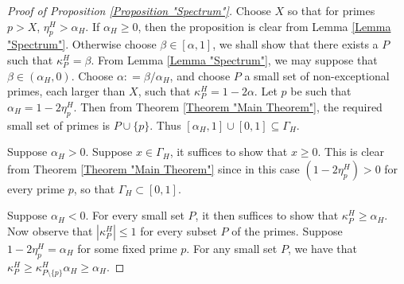 \documentclass[12pt, a4paper]{amsart}
\theoremstyle{remark}
\theoremstyle{proof}
\numberwithin{equation}{section}
\numberwithin{assumption}{section}
\begin{document}
	\begin{proof}[Proof of Proposition \ref{Proposition "Spectrum"}] Choose $X$ so that for primes $p > X$, $\eta_p^H > \alpha_H$. If $\alpha_H \geqslant 0$, then the proposition is clear from Lemma \ref{Lemma "Spectrum"}. Otherwise choose $\beta\in [\alpha,1]$, we shall show that there exists a $P$ such that $\kappa_P^H = \beta$. From Lemma \ref{Lemma "Spectrum"}, we may suppose that $\beta\in (\alpha_H,0)$. Choose $\alpha : = \beta/\alpha_H$, and choose $P$ a small set of non-exceptional primes, each larger than $X$, such that $\kappa_P^H = 1-2\alpha$. Let $p$ be such that $\alpha_H = 1-2\eta_p^H$. Then from Theorem \ref{Theorem "Main Theorem"}, the required small set of primes is $P\cup \{p\}$. Thus $[\alpha_H,1]\cup [0,1] \subseteq \Gamma_H$. 
		
	Suppose $\alpha_H > 0$. Suppose $x\in \Gamma_H$, it suffices to show that $x \geqslant 0$. This is clear from Theorem \ref{Theorem "Main Theorem"} since in this case $(1-2\eta_p^H) > 0$ for every prime $p$, so that $\Gamma_H \subset [0,1]$.
	
	Suppose $\alpha_H < 0$. For every small set $P$, it then suffices to show that $\kappa_P^H \geqslant \alpha_H$. Now observe that $|\kappa_P^H| \leqslant 1$ for every subset $P$ of the primes. Suppose $1-2\eta_p^H = \alpha_H$ for some fixed prime $p$. For any small set $P$, we have that $\kappa_P^H \geqslant \kappa_{P\setminus \{p\}}^H \alpha_H \geqslant \alpha_H$.
	\end{proof}

	
	
	
	
	
	
\end{document}
